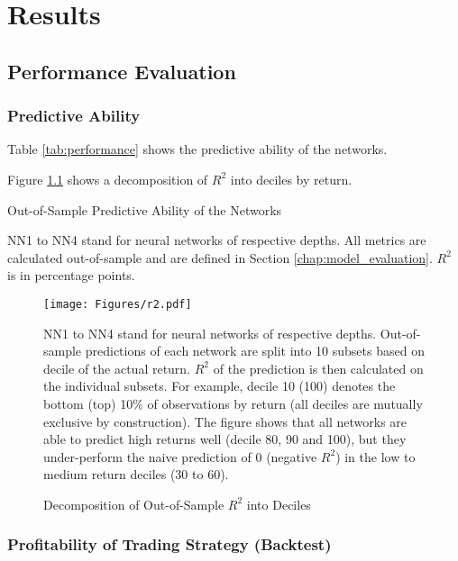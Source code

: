 \chapter{Results}
\label{chap:res}

\section{Performance Evaluation}
	
	\subsection{Predictive Ability}
	
		Table \ref{tab:performance} shows the predictive ability of the networks. 
		
		Figure \ref{fig:r2} shows a decomposition of $R^2$ into deciles by return.
				
			\begin{table}
				\centering
				
				\caption{Out-of-Sample Predictive Ability of the Networks}
				\label{tab:performance}
				\medskip
				\small
				NN1 to NN4 stand for neural networks of respective depths. All metrics are calculated out-of-sample and are defined in Section \ref{chap:model_evaluation}.  $R^2$ is in percentage points.  
			\end{table}
		
			\begin{figure}
				\texttt{[image: Figures/r2.pdf]}
				\caption{Decomposition of Out-of-Sample $R^2$ into Deciles}
				\label{fig:r2}
				\medskip
				\small 
				NN1 to NN4 stand for neural networks of respective depths. Out-of-sample predictions of each network are split into 10 subsets based on decile of the actual return. $R^2$ of the prediction is then calculated on the individual subsets. For example, decile 10 (100) denotes the bottom (top) 10\% of observations by return (all deciles are mutually exclusive by construction). The figure shows that all networks are able to predict high returns well (decile 80, 90 and 100), but they under-perform the naive prediction of 0 (negative $R^2$) in the low to medium return deciles (30 to 60).  
			\end{figure}
		

	\subsection{Profitability of Trading Strategy (Backtest)}
		\label{chap:backtest}
		
